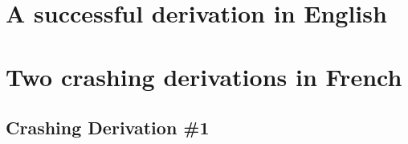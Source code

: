 \documentclass[MilwayThesis]{subfiles}
\begin{document}
\section{A successful derivation in English}

\section{Two crashing derivations in French}

\subsection{Crashing Derivation \#1}
\end{document}
